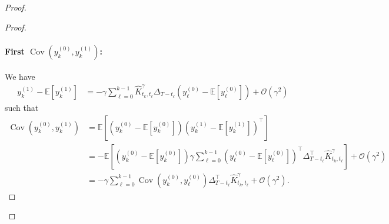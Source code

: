 \documentclass[11pt]{article}
\newcommand{\EE}{\mathbb{E}}
\newcommand{\cov}{\operatorname{Cov}}
\begin{document}
\begin{proof}
\begin{proof}
\paragraph{First $\cov(y^{(0)}_k, y^{(1)}_k)$:}
We have
\begin{align} \label{eq:y_1-mean}
y^{(1)}_k - \EE[y^{(1)}_k] &= - \gamma \sum_{\ell=0}^{k-1} \hat K^\gamma _{t_k,t_\ell} \Delta_{T-t_\ell} \left(y^{(0)}_\ell - \EE[y^{(0)}_\ell] \right) + \mathcal{O}(\gamma^2)
\end{align}
such that
\begin{align*}
\cov(y^{(0)}_k, y^{(1)}_k) &= \EE\left[(y^{(0)}_k- \EE[y^{(0)}_k])(y^{(1)}_k- \EE[y^{(1)}_k])^\top \right]  \\ &= - \EE\left[ \left(y^{(0)}_k - \EE[y^{(0)}_k] \right) \gamma \sum_{\ell=0}^{k-1}  \left(y^{(0)}_\ell - \EE[y^{(0)}_\ell] \right)^\top \Delta_{T-t_\ell}^\top  \hat K^\gamma_{t_k,t_\ell}  \right] + \mathcal{O}(\gamma^2) \\
&= - \gamma \sum_{\ell=0}^{k-1} \cov(y^{(0)}_k, y^{(0)}_\ell)  \Delta_{T-t_\ell}^\top  \hat K^\gamma_{t_k,t_\ell} + \mathcal{O}(\gamma^2).
\end{align*}

\end{proof}
\end{proof}
\end{document}
